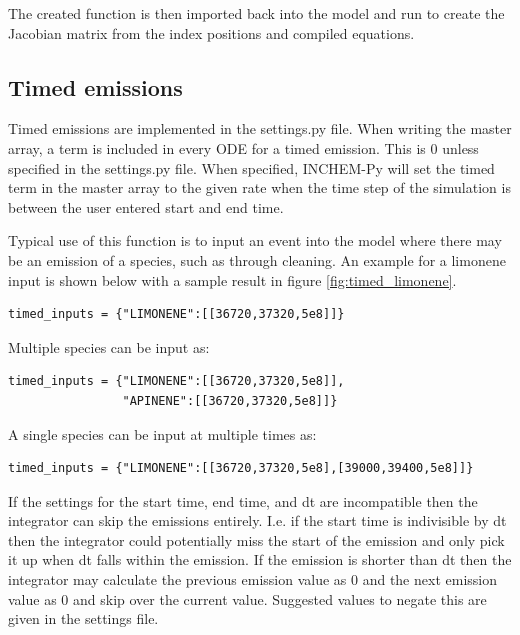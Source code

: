 \documentclass[a4paper]{refart}
\begin{document}
The created function is then imported back into the model and run to create the Jacobian matrix from the index positions and compiled equations.

\subsection{Timed emissions}\label{timed emissions, implementation}
Timed emissions are implemented in the settings.py file.  When writing the master array, a term is included in every ODE for a timed emission. This is 0 unless specified in the settings.py file. When specified, INCHEM-Py will set the timed term in the master array to the given rate when the time step of the simulation is between the user entered start and end time.

Typical use of this function is to input an event into the model where there may be an emission of a species, such as through cleaning. An example for a limonene input is shown below with a sample result in figure \ref{fig:timed_limonene}.

\begin{verbatim}
timed_inputs = {"LIMONENE":[[36720,37320,5e8]]}
\end{verbatim}

Multiple species can be input as:
\begin{verbatim}
timed_inputs = {"LIMONENE":[[36720,37320,5e8]],
                "APINENE":[[36720,37320,5e8]]}
\end{verbatim}

A single species can be input at multiple times as:
\begin{verbatim}
timed_inputs = {"LIMONENE":[[36720,37320,5e8],[39000,39400,5e8]]}
\end{verbatim}

If the settings for the start time, end time, and dt are incompatible then the integrator can skip the emissions entirely. I.e. if the start time is indivisible by dt then the integrator could potentially miss the start of the emission and only pick it up when dt falls within the emission. If the emission is shorter than dt then the integrator may calculate the previous emission value as 0 and the next emission value as 0 and skip over the current value. Suggested values to negate this are given in the settings file.
\end{document}
